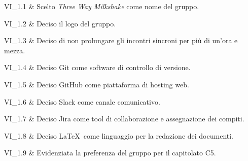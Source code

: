 VI\_1.1 & Scelto \textit{Three Way Milkshake} come nome del gruppo.
		
\tabularnewline 
VI\_1.2 & Deciso il logo del gruppo.

\tabularnewline 
VI\_1.3 & Deciso di non prolungare gli incontri sincroni per più di un'ora e mezza.
		
\tabularnewline 
VI\_1.4 & Deciso Git come software di controllo di versione.
	
\tabularnewline 
VI\_1.5 & Deciso GitHub come piattaforma di hosting web.
		
\tabularnewline 
VI\_1.6 & Deciso Slack come canale comunicativo.
		
\tabularnewline 
VI\_1.7 & Deciso Jira come tool di collaborazione e assegnazione dei compiti.
	
\tabularnewline 
VI\_1.8 & Deciso \LaTeX\ come linguaggio per la redazione dei documenti.
		
\tabularnewline
VI\_1.9 & Evidenziata la preferenza del gruppo per il capitolato C5.	
	
	
